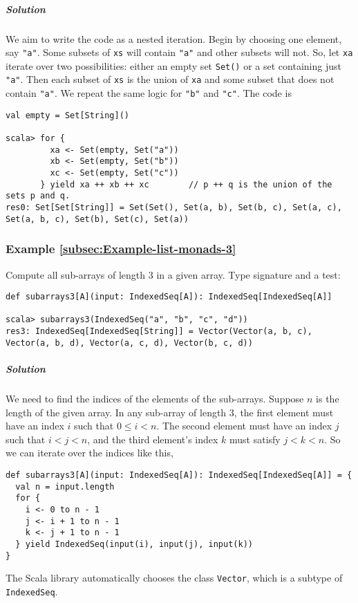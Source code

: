 \subparagraph{Solution}

We aim to write the code as a nested iteration. Begin by choosing
one element, say \lstinline!"a"!. Some subsets of \lstinline!xs!
will contain \lstinline!"a"! and other subsets will not. So, let
\lstinline!xa! iterate over two possibilities: either an empty set
\lstinline!Set()! or a set containing just \lstinline!"a"!. Then
each subset of \lstinline!xs! is the union of \lstinline!xa! and
some subset that does not contain \lstinline!"a"!. We repeat the
same logic for \lstinline!"b"! and \lstinline!"c"!. The code is
\begin{lstlisting}
val empty = Set[String]()

scala> for {
         xa <- Set(empty, Set("a"))
         xb <- Set(empty, Set("b"))
         xc <- Set(empty, Set("c"))
       } yield xa ++ xb ++ xc        // p ++ q is the union of the sets p and q.
res0: Set[Set[String]] = Set(Set(), Set(a, b), Set(b, c), Set(a, c), Set(a, b, c), Set(b), Set(c), Set(a))
\end{lstlisting}


\subsubsection{Example \label{subsec:Example-list-monads-3}\ref{subsec:Example-list-monads-3}}

Compute all sub-arrays of length $3$ in a given array. Type signature
and a test:
\begin{lstlisting}
def subarrays3[A](input: IndexedSeq[A]): IndexedSeq[IndexedSeq[A]]

scala> subarrays3(IndexedSeq("a", "b", "c", "d"))
res3: IndexedSeq[IndexedSeq[String]] = Vector(Vector(a, b, c), Vector(a, b, d), Vector(a, c, d), Vector(b, c, d))
\end{lstlisting}


\subparagraph{Solution}

We need to find the indices of the elements of the sub-arrays. Suppose
$n$ is the length of the given array. In any sub-array of length
$3$, the first element must have an index $i$ such that $0\leq i<n$.
The second element must have an index $j$ such that $i<j<n$, and
the third element's index $k$ must satisfy $j<k<n$. So we can iterate
over the indices like this,
\begin{lstlisting}
def subarrays3[A](input: IndexedSeq[A]): IndexedSeq[IndexedSeq[A]] = {
  val n = input.length
  for {
    i <- 0 to n - 1
    j <- i + 1 to n - 1
    k <- j + 1 to n - 1
  } yield IndexedSeq(input(i), input(j), input(k))
}
\end{lstlisting}
The Scala library automatically chooses the class \lstinline!Vector!,
which is a subtype of \lstinline!IndexedSeq!.

